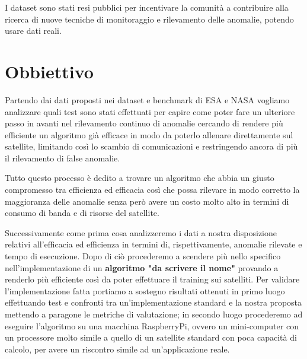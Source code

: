 I dataset sono stati resi pubblici per incentivare la comunità a contribuire alla ricerca di nuove tecniche di monitoraggio e rilevamento delle anomalie, potendo usare dati reali.

\section{Obbiettivo}
Partendo dai dati proposti nei dataset e benchmark di ESA e NASA vogliamo analizzare quali test sono stati effettuati per capire come poter fare un ulteriore passo in avanti nel rilevamento continuo di anomalie cercando di rendere più efficiente un algoritmo già efficace in modo da poterlo allenare direttamente sul satellite, limitando così lo scambio di comunicazioni e restringendo ancora di più il rilevamento di false anomalie.

Tutto questo processo è dedito a trovare un algoritmo che abbia un giusto compromesso tra efficienza ed efficacia così che possa rilevare in modo corretto la maggioranza delle anomalie senza però avere un costo molto alto in termini di consumo di banda e di risorse del satellite.

Successivamente come prima cosa analizzeremo i dati a nostra disposizione relativi all'efficacia ed efficienza in termini di, rispettivamente, anomalie rilevate e tempo di esecuzione.
Dopo di ciò procederemo a scendere più nello specifico nell'implementazione di un \textbf{algoritmo "da scrivere il nome" } provando a renderlo più efficiente così da poter effettuare il training sui satelliti.
Per validare l'implementazione fatta portiamo a sostegno risultati ottenuti in primo luogo effettuando test e confronti tra un'implementazione standard e la nostra proposta mettendo a paragone le metriche di valutazione; in secondo luogo procederemo ad eseguire l'algoritmo su una macchina RaspberryPi, ovvero un mini-computer con un processore molto simile a quello di un satellite standard con poca capacità di calcolo, per avere un riscontro simile ad un'applicazione reale.
